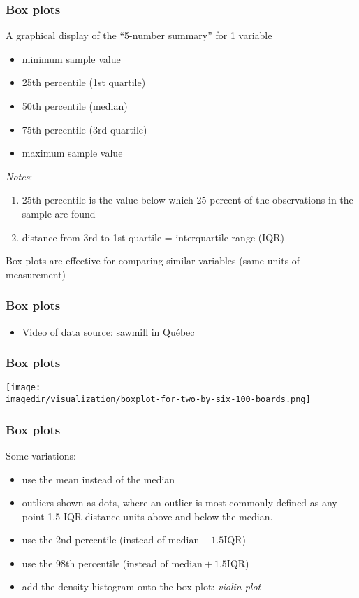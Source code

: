 \begin{frame}\frametitle{Box plots}
	
	A graphical display of the ``5-number summary'' for 1 variable 
	\begin{itemize}
		\item	minimum sample value 
		\item	25th percentile (1st quartile) 
		\item	50th percentile (median) 
		\item	75th percentile (3rd quartile) 
		\item	maximum sample value 
	\end{itemize}
	
	\emph{Notes}: 
	\begin{enumerate}
		\item	25th percentile is the value below which 25 percent of the observations in the sample are found 
		\item	distance from 3rd to 1st quartile = interquartile range (IQR) 
	\end{enumerate}
	
	Box plots are effective for comparing similar variables (same units of measurement)
\end{frame}

\begin{frame}\frametitle{Box plots}
	\begin{itemize}
		\item	Video of data source: sawmill in Québec
	\end{itemize}
\end{frame}

\begin{frame}\frametitle{Box plots}
	\begin{center}
		\texttt{[image: \\imagedir/visualization/boxplot-for-two-by-six-100-boards.png]}
	\end{center}
\end{frame}

\begin{frame}\frametitle{Box plots}
	
	Some variations:
	\begin{itemize}
		\item	use the mean instead of the median 
		\item	outliers shown as dots, where an outlier is most commonly defined as any point 1.5 IQR distance units above and below the median. 
		\item	use the 2nd percentile (instead of $\text{median} - 1.5\text{IQR}$) 
		\item	use the 98th percentile (instead of $\text{median} + 1.5\text{IQR}$) 
		\item	add the density histogram onto the box plot: \emph{violin plot} 
	\end{itemize}
\end{frame}

